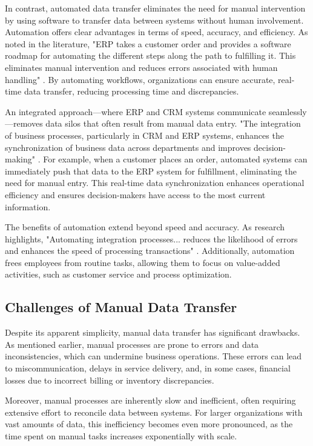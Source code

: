 In contrast, automated data transfer eliminates the need for manual intervention by using software to transfer data between systems without human involvement. Automation offers clear advantages in terms of speed, accuracy, and efficiency. As noted in the literature, "ERP takes a customer order and provides a software roadmap for automating the different steps along the path to fulfilling it. This eliminates manual intervention and reduces errors associated with human handling" \cite{almudimigh2009}. By automating workflows, organizations can ensure accurate, real-time data transfer, reducing processing time and discrepancies.

An integrated approach—where ERP and CRM systems communicate seamlessly—removes data silos that often result from manual data entry. "The integration of business processes, particularly in CRM and ERP systems, enhances the synchronization of business data across departments and improves decision-making" \cite{liu2012}. For example, when a customer places an order, automated systems can immediately push that data to the ERP system for fulfillment, eliminating the need for manual entry. This real-time data synchronization enhances operational efficiency and ensures decision-makers have access to the most current information.

The benefits of automation extend beyond speed and accuracy. As research highlights, "Automating integration processes... reduces the likelihood of errors and enhances the speed of processing transactions" \cite{sap2020}. Additionally, automation frees employees from routine tasks, allowing them to focus on value-added activities, such as customer service and process optimization.

\subsection{Challenges of Manual Data Transfer}

Despite its apparent simplicity, manual data transfer has significant drawbacks. As mentioned earlier, manual processes are prone to errors and data inconsistencies, which can undermine business operations. These errors can lead to miscommunication, delays in service delivery, and, in some cases, financial losses due to incorrect billing or inventory discrepancies.

Moreover, manual processes are inherently slow and inefficient, often requiring extensive effort to reconcile data between systems. For larger organizations with vast amounts of data, this inefficiency becomes even more pronounced, as the time spent on manual tasks increases exponentially with scale.

